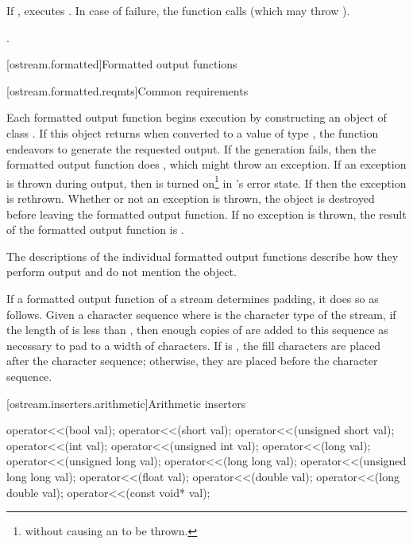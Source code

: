 \begin{itemdescr}
\pnum
\effects
If
,
executes
.
In case of failure, the function calls 
(which may throw ).

\pnum
\returns
{}.
\end{itemdescr}

[ostream.formatted]{Formatted output functions}

[ostream.formatted.reqmts]{Common requirements}

\pnum
Each formatted output function begins execution by constructing an object of class
.
If this object returns
when converted to a value of type
,
the function endeavors
to generate the requested output.
If the generation fails, then the formatted output function does
,
which might throw an exception.
If an exception is thrown during output, then
is turned on\footnote{without causing an
to be thrown.}
in
's
error state.
If
then the exception is rethrown.
Whether or not an exception is thrown, the
object is destroyed before leaving the formatted output function.
If no exception is thrown, the result of the formatted output function
is
.

\pnum
The descriptions of the individual formatted output functions
describe how they perform
output and do not mention the
object.

\pnum
If a formatted output function of a stream  determines
padding, it does so as
follows. Given a  character sequence  where
 is the character type of the stream, if
the length of  is less than , then enough copies of
 are added to this sequence as necessary to pad to a
width of  characters. If
 is
, the fill characters are placed
after the character sequence; otherwise, they are placed before the
character sequence.

[ostream.inserters.arithmetic]{Arithmetic inserters}

%
\begin{itemdecl}
operator<<(bool val);
operator<<(short val);
operator<<(unsigned short val);
operator<<(int val);
operator<<(unsigned int val);
operator<<(long val);
operator<<(unsigned long val);
operator<<(long long val);
operator<<(unsigned long long val);
operator<<(float val);
operator<<(double val);
operator<<(long double val);
operator<<(const void* val);
\end{itemdecl}

